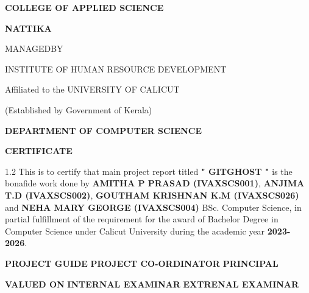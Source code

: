\documentclass[12pt, a4paper, oneside]{report}
\begin{document}
\begin{singlespacing}
\begin{center}
    {\Large \textbf{COLLEGE OF APPLIED SCIENCE} \par}
    \vspace{0.2cm}
    {\Large \textbf{NATTIKA} \par}
    
    \vspace{1cm}
    {\small MANAGEDBY \par}
    \vspace{0.2cm}
    {\small INSTITUTE OF HUMAN RESOURCE DEVELOPMENT \par}
    \vspace{0.2cm}
    {\small Affiliated to the UNIVERSITY OF CALICUT \par}
    \vspace{0.2cm}
    {\small (Established by Government of Kerala) \par}
    
    \vspace{0.5cm}
    \begin{figure}[H]
        \centering
    \end{figure}
    
    \vspace{0.5cm}
    {\normalsize \textbf{DEPARTMENT OF COMPUTER SCIENCE} \par}
    \vspace{0.2cm}
    {\normalsize \textbf{CERTIFICATE} \par}
\end{center}
\vspace{0.2cm}

\begin{spacing}{1.2}
\noindent This is to certify that main project report titled \textbf{" GITGHOST "} is the bonafide work done by \textbf{AMITHA P PRASAD (IVAXSCS001)}, \textbf{ANJIMA T.D (IVAXSCS002)}, \textbf{GOUTHAM KRISHNAN K.M (IVAXSCS026)} and \textbf{NEHA MARY GEORGE (IVAXSCS004)} BSc. Computer Science, in partial fulfillment of the requirement for the award of Bachelor Degree in Computer Science under Calicut University during the academic year \textbf{2023- 2026}.
\end{spacing}

\vspace{1.5cm}

\noindent \textbf{\small PROJECT GUIDE} \hfill \textbf{\small PROJECT CO-ORDINATOR} \hfill \textbf{\small PRINCIPAL}

\vspace{1.5cm}

\noindent \textbf{\small VALUED ON} \hfill \textbf{\small INTERNAL EXAMINAR} \hfill \textbf{\small EXTRENAL EXAMINAR}
\end{singlespacing}
\newpage
\end{document}
